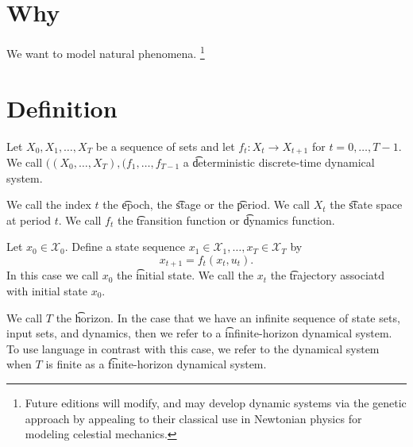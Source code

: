 
\section*{Why}

We want to model natural phenomena.
  \ifhmode\unskip\fi\footnote{
Future editions will modify, and may develop dynamic systems via the genetic approach by appealing to their classical use in Newtonian physics for modeling celestial mechanics.
  }

\section*{Definition}

Let $X_0, X_1, \dots , X_T$ be a sequence of sets and let $f_t: X_t \to X_{t+1}$ for $t = 0, \dots , T-1$.
We call $((X_0, \dots , X_T), (f_1, \dots , f_{T-1}$ a \t{deterministic discrete-time dynamical system}.

We call the index $t$ the \t{epoch}, the \t{stage} or the \t{period}.
We call $X_t$ the \t{state space} at period $t$.
We call $f_t$ the \t{transition function} or \t{dynamics function}.

Let $x_0 \in \mathcal{X} _0$. Define a state sequence $x_1 \in \mathcal{X} _1, \dots , x_T \in \mathcal{X} _T$ by
  \[
x_{t+1} = f_t(x_t, u_t).
  \]
In this case we call $x_0$ the \t{initial state}.
We call the $x_t$ the \t{trajectory} associatd with initial state $x_0$.

We call $T$ the \t{horizon}.
In the case that we have an infinite sequence of state sets, input sets, and dynamics, then we refer to a \t{infinite-horizon} dynamical system.
To use language in contrast with this case, we refer to the dynamical system when $T$ is finite as a \t{finite-horizon} dynamical system.

\blankpage
